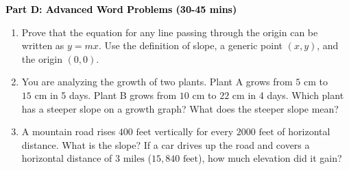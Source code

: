 \documentclass[12pt, letterpaper, fleqn]{article}
\begin{document}
\newpage

\begin{tcolorbox}[colback=customteal!20]
\large\textcolor{black}{\textbf{Part D: Advanced Word Problems (30-45 mins)}}
\end{tcolorbox}

\vspace{3mm}

\begin{enumerate}[itemsep=5.5cm, leftmargin=0.6cm, resume]
\item Prove that the equation for any line passing through the origin can be written as $y = mx$. Use the definition of slope, a generic point $(x,y)$, and the origin $(0,0)$.
\item You are analyzing the growth of two plants. Plant A grows from $5\text{ cm}$ to $15\text{ cm}$ in 5 days. Plant B grows from $10\text{ cm}$ to $22\text{ cm}$ in 4 days. Which plant has a steeper slope on a growth graph? What does the steeper slope mean?
\item A mountain road rises $400\text{ feet}$ vertically for every $2000\text{ feet}$ of horizontal distance. What is the slope? If a car drives up the road and covers a horizontal distance of $3\text{ miles}$ ($15,840\text{ feet}$), how much elevation did it gain?
\end{enumerate}
\end{document}
